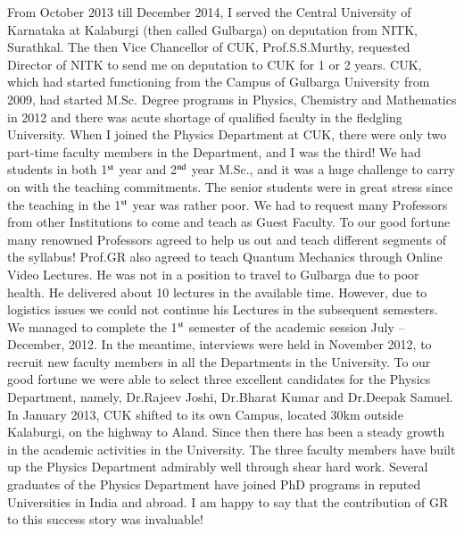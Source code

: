 From October 2013 till December 2014, I served the Central University of Karnataka at Kalaburgi (then called Gulbarga) on deputation from NITK, Surathkal. The then Vice Chancellor of CUK, Prof.S.S.Murthy, requested Director of NITK to send me on deputation to CUK for 1 or 2 years. CUK, which had started functioning from the Campus of Gulbarga University from 2009, had started M.Sc. Degree programs in Physics, Chemistry and Mathematics in 2012 and there was acute shortage of qualified faculty in the fledgling University. When I joined the Physics Department at CUK, there were only two part-time faculty members in the Department, and I was the third! We had students in both 1$^{\rm st}$ year and 2$^{\rm nd}$ year M.Sc., and it was a huge challenge to carry on with the teaching commitments. The senior students were in great stress since the teaching in the 1$^{\rm st}$ year was rather poor. We had to request many Professors from other Institutions to come and teach as Guest Faculty. To our good fortune many renowned Professors agreed to help us out and teach different segments of the syllabus! Prof.GR also agreed to teach Quantum Mechanics through Online Video Lectures. He was not in a position to travel to Gulbarga due to poor health. He delivered about 10 lectures in the available time. However, due to logistics issues we could not continue his Lectures in the subsequent semesters. We managed to complete the 1$^{\rm st}$ semester of the academic session July – December, 2012. In the meantime, interviews were held in November 2012, to recruit new faculty members in all the Departments in the University. To our good fortune we were able to select three excellent candidates for the Physics Department, namely, Dr.Rajeev Joshi, Dr.Bharat Kumar and Dr.Deepak Samuel. In January 2013, CUK shifted to its own Campus, located 30km outside Kalaburgi, on the highway to Aland. Since then there has been a steady growth in the academic activities in the University. The three faculty members have built up the Physics Department admirably well through shear hard work. Several graduates of the Physics Department have joined PhD programs in reputed Universities in India and abroad. I am happy to say that the contribution of GR to this success story was invaluable!


